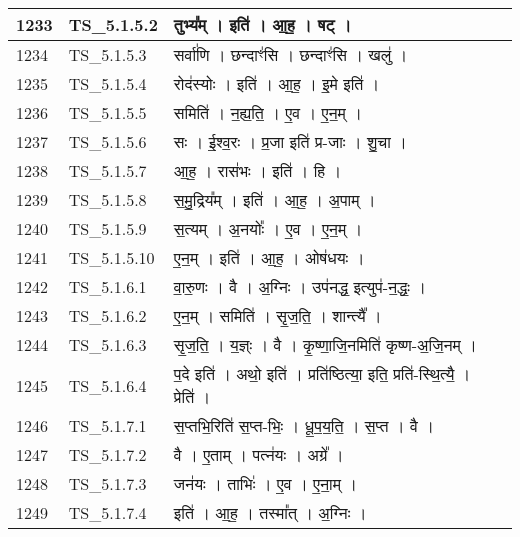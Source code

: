 \documentclass[17pt]{extarticle}
\begin{document}
\begin{longtable}{||p{0.4in}||p{0.9in}||p{4.0in}||p{0.9in}||}
        \hline
            1233 & TS\_5.1.5.2 & तुभ्य᳚म्   ।   इति॑   ।   आ॒ह॒   ।   षट्   ।    &      \\
        \hline
            1234 & TS\_5.1.5.3 & सर्वा॑णि   ।   छन्दाꣳ॑सि   ।   छन्दाꣳ॑सि   ।   खलु॑   ।    &      \\
        \hline
            1235 & TS\_5.1.5.4 & रोद॑स्योः   ।   इति॑   ।   आ॒ह॒   ।   इ॒मे इति॑   ।    &      \\
        \hline
            1236 & TS\_5.1.5.5 & समिति॑   ।   न॒ह्य॒ति॒   ।   ए॒व   ।   ए॒न॒म्   ।    &      \\
        \hline
            1237 & TS\_5.1.5.6 & सः   ।   ई॒श्व॒रः   ।   प्र॒जा इति॑ प्र{-}जाः   ।   शु॒चा   ।    &      \\
        \hline
            1238 & TS\_5.1.5.7 & आ॒ह॒   ।   रास॑भः   ।   इति॑   ।   हि   ।    &      \\
        \hline
            1239 & TS\_5.1.5.8 & स॒मु॒द्रिय᳚म्   ।   इति॑   ।   आ॒ह॒   ।   अ॒पाम्   ।    &      \\
        \hline
            1240 & TS\_5.1.5.9 & स॒त्यम्   ।   अ॒नयोः᳚   ।   ए॒व   ।   ए॒न॒म्   ।    &      \\
        \hline
            1241 & TS\_5.1.5.10 & ए॒न॒म्   ।   इति॑   ।   आ॒ह॒   ।   ओष॑धयः   ।    &      \\
        \hline
            1242 & TS\_5.1.6.1 & वा॒रु॒णः   ।   वै   ।   अ॒ग्निः   ।   उप॑नद्ध॒ इत्युप॑{-}न॒द्धः॒   ।    &      \\
        \hline
            1243 & TS\_5.1.6.2 & ए॒न॒म्   ।   समिति॑   ।   सृ॒ज॒ति॒   ।   शान्त्यै᳚   ।    &      \\
        \hline
            1244 & TS\_5.1.6.3 & सृ॒ज॒ति॒   ।   य॒ज्ञ्ः   ।   वै   ।   कृ॒ष्णा॒जि॒नमिति॑ कृष्ण{-}अ॒जि॒नम्   ।    &      \\
        \hline
            1245 & TS\_5.1.6.4 & प॒दे इति॑   ।   अथो॒ इति॑   ।   प्रति॑ष्ठित्या॒ इति॒ प्रति॑{-}स्थि॒त्यै॒   ।   प्रेति॑   ।    &      \\
        \hline
            1246 & TS\_5.1.7.1 & स॒प्तभि॒रिति॑ स॒प्त{-}भिः॒   ।   धू॒प॒य॒ति॒   ।   स॒प्त   ।   वै   ।    &      \\
        \hline
            1247 & TS\_5.1.7.2 & वै   ।   ए॒ताम्   ।   पत्न॑यः   ।   अग्रे᳚   ।    &      \\
        \hline
            1248 & TS\_5.1.7.3 & जन॑यः   ।   ताभिः॑   ।   ए॒व   ।   ए॒ना॒म्   ।    &      \\
        \hline
            1249 & TS\_5.1.7.4 & इति॑   ।   आ॒ह॒   ।   तस्मा᳚त्   ।   अ॒ग्निः   ।    &      \\

\end{longtable}
\end{document}
